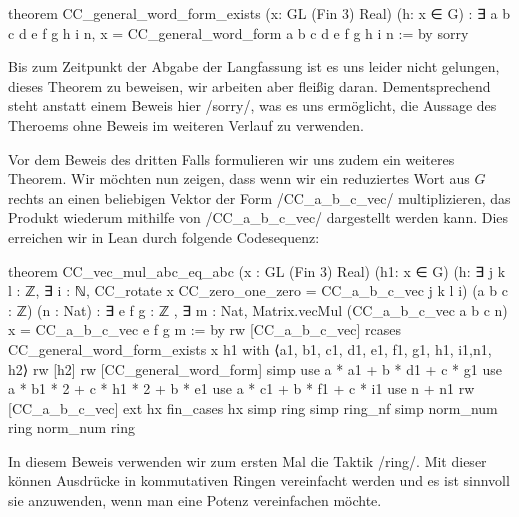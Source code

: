 \documentclass[10pt]{article}
\begin{document}
\begin{leancode}
theorem CC_general_word_form_exists (x: GL (Fin 3) Real) (h: x ∈ G) :
  ∃ a b c d e f g h i n, x = CC_general_word_form a b c d e f g h i n := by
    sorry
\end{leancode}
\noindent Bis zum Zeitpunkt der Abgabe der Langfassung ist es uns leider nicht gelungen, dieses Theorem zu beweisen, wir arbeiten aber fleißig daran. Dementsprechend steht anstatt einem Beweis hier \lean/sorry/, was es uns ermöglicht, die Aussage des Theroems ohne Beweis im weiteren Verlauf zu verwenden.\par

\noindent Vor dem Beweis des dritten Falls formulieren wir uns zudem ein weiteres Theorem. Wir möchten nun zeigen, dass wenn wir ein reduziertes Wort aus $G$ rechts an einen beliebigen Vektor der Form \lean/CC_a_b_c_vec/ multiplizieren, das Produkt wiederum mithilfe von \lean/CC_a_b_c_vec/ dargestellt werden kann. Dies erreichen wir in Lean durch folgende Codesequenz:
\begin{leancode}
theorem CC_vec_mul_abc_eq_abc (x : GL (Fin 3) Real) (h1: x ∈ G)
  (h: ∃ j k l : ℤ, ∃ i : ℕ, CC_rotate x CC_zero_one_zero = CC_a_b_c_vec j k l i) 
  (a b c : ℤ) (n : Nat) :
  ∃ e f g : ℤ , ∃ m : Nat, Matrix.vecMul (CC_a_b_c_vec a b c n) x = CC_a_b_c_vec e f g m := by
  rw [CC_a_b_c_vec]
  rcases CC_general_word_form_exists x h1 with ⟨a1, b1, c1, d1, e1, f1, g1, h1, i1,n1, h2⟩
  rw [h2]
  rw [CC_general_word_form]
  simp
  use a * a1 + b * d1 + c * g1
  use a * b1 * 2 + c * h1 * 2 + b * e1
  use  a * c1 + b * f1 + c * i1
  use n + n1
  rw [CC_a_b_c_vec]
  ext hx
  fin_cases hx
  simp
  ring
  simp
  ring_nf
  simp
  norm_num
  ring
  norm_num
  ring
\end{leancode}
In diesem Beweis verwenden wir zum ersten Mal die Taktik \lean/ring/. Mit dieser können Ausdrücke in kommutativen Ringen vereinfacht werden und es ist sinnvoll sie anzuwenden, wenn man eine Potenz vereinfachen möchte.
\end{document}
